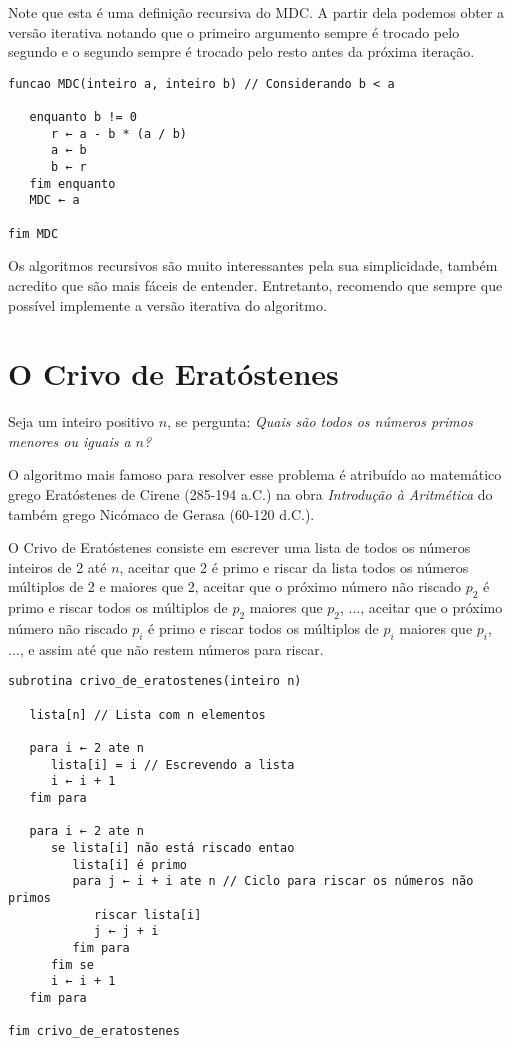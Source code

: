 Note que esta é uma definição recursiva do MDC. A partir dela podemos obter
a versão iterativa notando que o primeiro argumento sempre é trocado pelo
segundo e o segundo sempre é trocado pelo resto antes da próxima iteração.

\begin{lstlisting}[style=pseudo]
funcao MDC(inteiro a, inteiro b) // Considerando b < a

   enquanto b != 0
      r ← a - b * (a / b)
      a ← b
      b ← r
   fim enquanto
   MDC ← a
      
fim MDC
\end{lstlisting}

Os algoritmos recursivos são muito interessantes pela sua simplicidade, também
acredito que são mais fáceis de entender. Entretanto, recomendo que
sempre que possível implemente a versão iterativa do algoritmo.





\section{O Crivo de Eratóstenes}

Seja um inteiro positivo $n$, se pergunta: \textit{Quais são todos
os números primos menores ou iguais a $n$?}

O algoritmo mais famoso para resolver esse problema é atribuído
ao matemático grego Eratóstenes de Cirene (285-194 a.C.) na obra
\textit{Introdução à Aritmética} do também grego Nicómaco de Gerasa (60-120 d.C.).

O Crivo de Eratóstenes consiste em escrever uma lista de todos os números inteiros
de 2 até $n$, aceitar que 2 é primo e riscar da lista todos os números múltiplos
de 2 e maiores que 2, aceitar que o próximo número não riscado $p_2$ é primo
e riscar todos os múltiplos de $p_2$ maiores que $p_2$, ..., aceitar
que o próximo número não riscado $p_i$ é primo e riscar todos os
múltiplos de $p_i$ maiores que $p_i$, ..., e assim até que não restem números
para riscar.

\begin{lstlisting}[style=pseudo]
subrotina crivo_de_eratostenes(inteiro n)

   lista[n] // Lista com n elementos

   para i ← 2 ate n
      lista[i] = i // Escrevendo a lista
      i ← i + 1
   fim para

   para i ← 2 ate n
      se lista[i] não está riscado entao
         lista[i] é primo
         para j ← i + i ate n // Ciclo para riscar os números não primos
            riscar lista[i]
            j ← j + i
         fim para
      fim se
      i ← i + 1
   fim para
      
fim crivo_de_eratostenes
\end{lstlisting}





